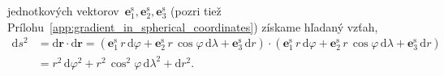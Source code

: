 \documentclass[a4paper, 12pt]{book}
\newcommand{\diff}{\mathrm d}
\let\vec\mathbf
\begin{document}
jednotkových vektorov~$\vec e_1^\mathrm{s}, \vec e_2^\mathrm{s}, \vec 
e_3^\mathrm{s}$ (pozri tiež 
Prílohu~\ref{app:gradient_in_spherical_coordinates}) získame hľadaný vzťah,
%
\begin{equation}
\begin{split}
\diff s^2 &= \diff \vec r \cdot \diff \vec r = \left( \vec e_1^\mathrm{s} \, 
r \, \diff \varphi + \vec e_2^\mathrm{s} \, r \, \cos\varphi \, \diff \lambda 
+ \vec e_3^\mathrm{s} \, \diff r \right) \cdot \left( \vec e_1^\mathrm{s} \, 
r \, \diff \varphi + \vec e_2^\mathrm{s} \, r \, \cos\varphi \, \diff \lambda 
+ \vec e_3^\mathrm{s} \, \diff r \right)\\
%
&=  r^2 \, \diff\varphi^2 + r^2 \, \cos^2\varphi \, \diff\lambda^2 + \diff 
r^2{.}
\end{split}
\end{equation}







\printbibliography[title=Literat\'{u}ra]

\end{document}

